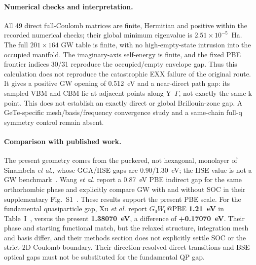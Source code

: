 \paragraph{Numerical checks and interpretation.}
All 49 direct full-Coulomb matrices are finite, Hermitian and positive
within the recorded numerical checks; their global minimum eigenvalue is
\(2.51\times10^{-5}\)~Ha.  The full \(201\times164\) GW table is finite,
with no high-empty-state intrusion into the occupied manifold.  The
imaginary-axis self-energy is finite, and the fixed PBE frontier indices
30/31 reproduce the occupied/empty envelope gap.  Thus this calculation
does not reproduce the catastrophic EXX failure of the original route.
It gives a positive GW opening of 0.512~eV and a near-direct path gap: its
sampled VBM and CBM lie at adjacent points along Y--\(\Gamma\), not exactly
the same k point.  This does not establish an exactly direct or global
Brillouin-zone gap.  A GeTe-specific mesh/basis/frequency convergence study
and a same-chain full-q symmetry control remain absent.

\paragraph{Comparison with published work.}
The present geometry comes from the puckered, not hexagonal, monolayer of
Sinambela \emph{et al.}, whose GGA/HSE gaps are 0.90/1.30~eV;
the HSE value is not a GW benchmark~\cite{sinambela2021gete}.
Wang \emph{et al.} report a 0.87~eV PBE indirect gap for the same
orthorhombic phase and explicitly compare GW with and without SOC in
their supplementary Fig.~S1~\cite{wang2021tellurides}.
These results support the present PBE scale.  For the fundamental
quasiparticle gap, Xu \emph{et al.} report \(G_0W_0\)@PBE
\textbf{1.21~eV} in Table~I~\cite{xu2017monochalcogenides}, versus the
present \textbf{1.38070~eV}, a difference of \textbf{+0.17070~eV}.
Their phase and starting functional match, but the relaxed structure,
integration mesh and basis differ, and their methods section does not
explicitly settle SOC or the strict-2D Coulomb boundary.  Their
direction-resolved direct transitions and BSE optical gaps must not be
substituted for the fundamental QP gap.

